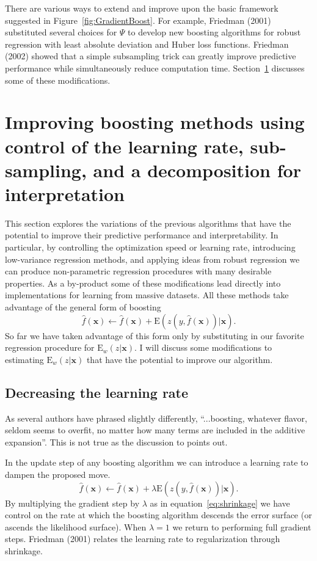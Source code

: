 \documentclass{article}
\newcommand{\EV}{\mathrm{E}}
\begin{document}
There are various ways to extend and improve upon the basic framework
suggested in Figure~\ref{fig:GradientBoost}. For example, Friedman
(2001) substituted several choices for $\Psi$ to develop new boosting
algorithms for robust regression with least absolute deviation and
Huber loss functions. Friedman (2002) showed that a simple subsampling
trick can greatly improve predictive performance while simultaneously
reduce computation time. Section~\ref{GBMModifications} discusses some
of these modifications.

\section{Improving boosting methods using control of the learning rate, sub-sampling, and a decomposition for interpretation} \label{GBMModifications}

This section explores the variations of the previous algorithms that
have the potential to improve their predictive performance and
interpretability. In particular, by controlling the optimization speed
or learning rate, introducing low-variance regression methods, and
applying ideas from robust regression we can produce non-parametric
regression procedures with many desirable properties. As a by-product
some of these modifications lead directly into implementations for
learning from massive datasets. All these methods take advantage of
the general form of boosting
\begin{equation} 
\hat f(\mathbf{x}) \leftarrow \hat f(\mathbf{x}) + \EV(z(y,\hat f(\mathbf{x}))|\mathbf{x}). 
\end{equation}
So far we have taken advantage of this form only by substituting in
our favorite regression procedure for $\EV_w(z|\mathbf{x})$. I will
discuss some modifications to estimating $\EV_w(z|\mathbf{x})$ that
have the potential to improve our algorithm.

\subsection{Decreasing the learning rate}
As several authors have phrased slightly differently, ``...boosting,
whatever flavor, seldom seems to overfit, no matter how many terms are
included in the additive expansion''. This is not true as the
discussion to \cite{FHT:2000} points out.

In the update step of any boosting algorithm we can introduce a
learning rate to dampen the proposed move.
\begin{equation} 
\label{eq:shrinkage} 
\hat f(\mathbf{x}) \leftarrow \hat f(\mathbf{x}) + \lambda \EV(z(y,\hat f(\mathbf{x}))|\mathbf{x}). 
\end{equation} 
By multiplying the gradient step by $\lambda$ as in
equation~\ref{eq:shrinkage} we have control on the rate at which the
boosting algorithm descends the error surface (or ascends the
likelihood surface). When $\lambda=1$ we return to performing full
gradient steps. Friedman (2001) relates the learning rate to
regularization through shrinkage.
\end{document}
